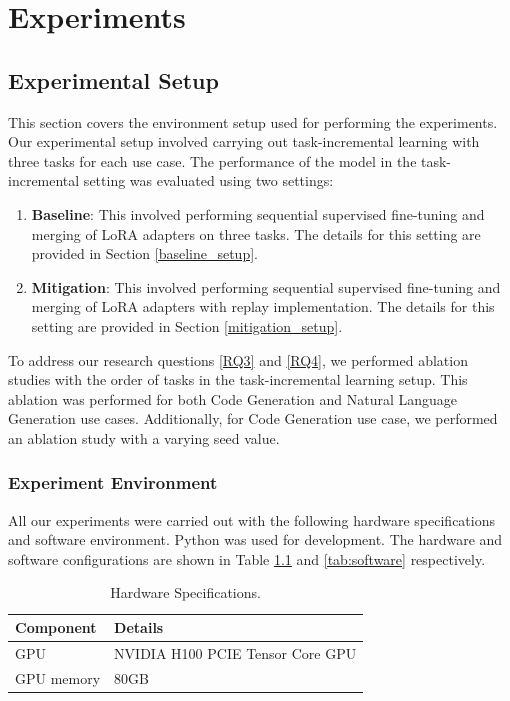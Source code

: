 
\chapter{Experiments} %

\label{Experiments} 


\section{Experimental Setup}
This section covers the environment setup used for performing the experiments. Our experimental setup involved carrying out task-incremental learning with three tasks for each use case. The performance of the model in the task-incremental setting was evaluated using two settings:
\begin{enumerate}
\item \textbf{Baseline}: This involved performing sequential supervised fine-tuning and merging of LoRA adapters on three tasks. The details for this setting are provided in Section \ref{baseline_setup}.
\item \textbf{Mitigation}: This involved performing sequential supervised fine-tuning and merging of LoRA adapters with replay implementation. The details for this setting are provided in Section \ref{mitigation_setup}.
\end{enumerate}

To address our research questions \ref{RQ3} and \ref{RQ4}, we performed ablation studies with the order of tasks in the task-incremental learning setup. This ablation was performed for both Code Generation and Natural Language Generation use cases.
Additionally, for Code Generation use case, we performed an ablation study with a varying seed value.


\subsection{Experiment Environment}
All our experiments were carried out with the following hardware specifications and software environment. Python was used for development. The hardware and software configurations are shown in Table \ref{tab:hardware} and \ref{tab:software} respectively.

\begin{table}[h!]
\centering
\caption{Hardware Specifications.}
\label{tab:hardware}
\begin{tabular}{| m{4cm} | m{6cm} |}
\hline
\textbf{Component} & \textbf{Details} \\
\hline
GPU & NVIDIA H100 PCIE Tensor Core GPU \\
GPU memory & 80GB \\
\hline
\end{tabular}
\end{table}

